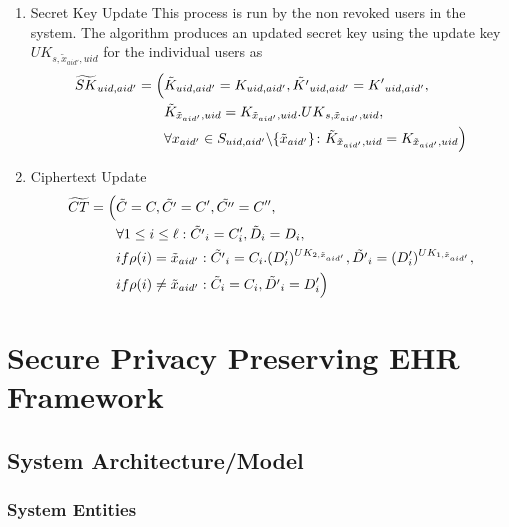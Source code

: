 \begin{enumerate}
\begin{enumerate}
		
		\item Secret Key Update
		This process is run by the non revoked users in the system. The algorithm produces an updated secret key using the update key ${UK}_{s,\tilde{x}_{aid'},uid}$ for the individual users as
		\begin{align*}
			\widetilde{SK}_{uid,aid'} = \Bigl(&\tilde{K}_{uid,aid'} = {K}_{uid,aid'},\tilde{K'}_{uid,aid'} = {K'}_{uid,aid'},\\
			&\tilde{K}_{\tilde{x}_{aid'},uid} = {K}_{\tilde{x}_{aid'},uid}.{UK}_{s,\tilde{x}_{aid'},uid},\\
			&\forall x_{aid'} \in S_{uid,aid'} \backslash \{ \tilde{x}_{aid'} \} \colon \tilde{K}_{\tilde{x}_{aid'},uid} = {K}_{\tilde{x}_{aid'},uid}  \Bigl) 
		\end{align*}
		
		\item Ciphertext Update
		\begin{align*}
			\widetilde{CT} = \Bigl(&\tilde{C} = C, \tilde{C'} = C', \tilde{C''} = C'',\\
			&\forall 1 \leq i \leq \ell: \tilde{C'}_{i} = C'_{i}, \tilde{D}_{i} = D_{i},\\
			&if \rho(i) = \tilde{x}_{aid'} : \tilde{C'}_{i} = C_{i} . (D'_{i})^{UK_{2,\tilde{x}_{aid'}}}, \tilde{D'}_{i} = (D'_{i})^{UK_{1,\tilde{x}_{aid'}}},\\
			&if \rho(i) \neq \tilde{x}_{aid'} : \tilde{C}_{i} = C_{i}, \tilde{D'}_{i} = D'_{i}\Bigl)
		\end{align*}
	\end{enumerate}
	
\end{enumerate}



\section{Secure Privacy Preserving EHR Framework}


\subsection{System Architecture/Model}

\subsubsection{System Entities}


